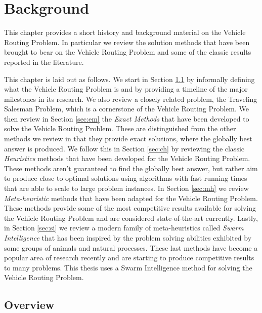 
\chapter{Background}
\label{chap:background}

This chapter provides a short history and background material on the Vehicle Routing Problem. In particular we review the solution methods that have been brought to bear on the Vehicle Routing Problem and some of the classic results reported in the literature.

This chapter is laid out as follows. We start in Section \ref{sec:vo} by informally defining what the Vehicle Routing Problem is and by providing a timeline of the major milestones in its research. We also review a closely related problem, the Traveling Salesman Problem, which is a cornerstone of the Vehicle Routing Problem. We then review in Section \ref{sec:em} the \emph{Exact Methods} that have been developed to solve the Vehicle Routing Problem. These are distinguished from the other methods we review in that they provide exact solutions, where the globally best answer is produced. We follow this in Section \ref{sec:ch} by reviewing the classic \emph{Heuristics} methods that have been developed for the Vehicle Routing Problem. These methods aren't guaranteed to find the globally best answer, but rather aim to produce close to optimal solutions using algorithms with fast running times that are able to scale to large problem instances. In Section \ref{sec:mh} we review \emph{Meta-heuristic} methods that have been adapted for the Vehicle Routing Problem. These methods provide some of the most competitive results available for solving the Vehicle Routing Problem and are considered state-of-the-art currently. Lastly, in Section \ref{sec:si} we review a modern family of meta-heuristics called \emph{Swarm Intelligence} that has been inspired by the problem solving abilities exhibited by some groups of animals and natural processes. These last methods have become a popular area of research recently and are starting to produce competitive results to many problems. This thesis uses a Swarm Intelligence method for solving the Vehicle Routing Problem.

\section{Overview}
\label{sec:vo}

